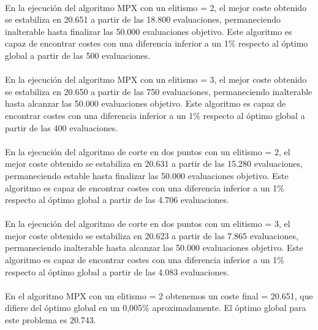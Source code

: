 	\paragraph{}En la ejecución del algoritmo MPX con un elitismo = 2, el mejor coste obtenido se estabiliza en 20.651 a partir de las 18.800 evaluaciones, permaneciendo inalterable hasta finalizar las 50.000 evaluaciones objetivo. Este algoritmo es capaz de encontrar costes con una diferencia inferior a un 1\% respecto al óptimo global a partir de las 500 evaluaciones.
	
	\paragraph{}En la ejecución del algoritmo MPX con un elitismo = 3, el mejor coste obtenido se estabiliza en 20.650 a partir de las 750 evaluaciones, permaneciendo inalterable hasta alcanzar las 50.000 evaluaciones objetivo. Este algoritmo es capaz de encontrar costes con una diferencia inferior a un 1\% respecto al óptimo global a partir de las 400 evaluaciones.
	
	\paragraph{}En la ejecución del algoritmo de corte en dos puntos con un elitismo = 2, el mejor coste obtenido se estabiliza en 20.631 a partir de las 15.280 evaluaciones, permaneciendo estable hasta finalizar las 50.000 evaluaciones objetivo. Este algoritmo es capaz de encontrar costes con una diferencia inferior a un 1\% respecto al óptimo global a partir de las 4.706 evaluaciones.
	
	\paragraph{}En la ejecución del algoritmo de corte en dos puntos con un elitismo = 3, el mejor coste obtenido se estabiliza en 20.623 a partir de las 7.865 evaluaciones, permaneciendo inalterable hasta alcanzar las 50.000 evaluaciones objetivo. Este algoritmo es capaz de encontrar costes con una diferencia inferior a un 1\% respecto al óptimo global a partir de las 4.083 evaluaciones.
	
	\paragraph{}En el algoritmo MPX con un elitismo = 2 obtenemos un coste final = 20.651, que difiere del óptimo global en un 0,005\% aproximadamente. El óptimo global para este problema es 20.743.
	
